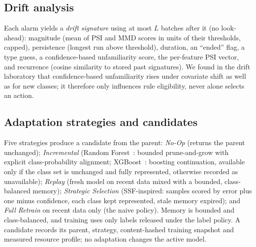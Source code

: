 \documentclass[conference]{IEEEtran}
\begin{document}
\subsection{Drift analysis}
Each alarm yields a \emph{drift signature} using at most $L$ batches after it (no look-ahead): magnitude (mean of PSI and MMD scores in units of their thresholds, capped), persistence (longest run above threshold), duration, an ``ended'' flag, a type guess, a confidence-based unfamiliarity score, the per-feature PSI vector, and recurrence (cosine similarity to stored past signatures). We found in the drift laboratory that confidence-based unfamiliarity rises under covariate shift as well as for new classes; it therefore only influences rule eligibility, never alone selects an action.

\subsection{Adaptation strategies and candidates}
Five strategies produce a candidate from the parent: \emph{No-Op} (returns the parent unchanged); \emph{Incremental} (Random Forest~\cite{breiman2001rf}: bounded prune-and-grow with explicit class-probability alignment; XGBoost~\cite{chen2016xgboost}: boosting continuation, available only if the class set is unchanged and fully represented, otherwise recorded as unavailable); \emph{Replay} (fresh model on recent data mixed with a bounded, class-balanced memory); \emph{Strategic Selection} (SSF-inspired: samples scored by error plus one minus confidence, each class kept represented, stale memory expired); and \emph{Full Retrain} on recent data only (the naive policy). Memory is bounded and class-balanced, and training uses only labels released under the label policy. A candidate records its parent, strategy, content-hashed training snapshot and measured resource profile; no adaptation changes the active model.
\end{document}
